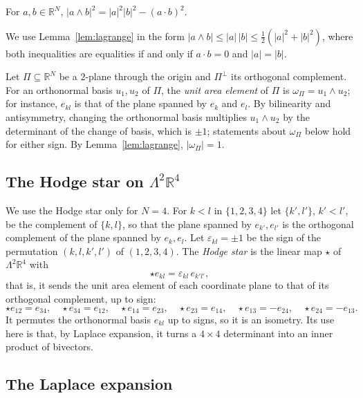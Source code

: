\begin{lemma}
  \label{lem:lagrange}
  For $a, b \in \mathbb{R}^{N}$,
  $|a \wedge b|^{2} = |a|^{2}|b|^{2} - (a \cdot b)^{2}$.
\end{lemma}

We use Lemma~\ref{lem:lagrange} in the form $|a \wedge b| \leq |a|\,|b| \leq
\frac12(|a|^{2} + |b|^{2})$, where both inequalities are equalities if and only
if $a \cdot b = 0$ and $|a| = |b|$.

Let $\Pi \subseteq \mathbb{R}^{N}$ be a $2$-plane through the origin and
$\Pi^{\perp}$ its orthogonal complement. For an orthonormal basis $u_{1},
u_{2}$ of $\Pi$, the \emph{unit area element} of $\Pi$ is
$\omega_{\Pi} = u_{1} \wedge u_{2}$; for instance, $e_{kl}$ is that of the
plane spanned by $e_{k}$ and $e_{l}$. By bilinearity and antisymmetry,
changing the orthonormal basis multiplies $u_{1} \wedge u_{2}$ by the
determinant of the change of basis, which is $\pm 1$; statements about
$\omega_{\Pi}$ below hold for either sign. By Lemma~\ref{lem:lagrange}, $|\omega_{\Pi}| = 1$.

\subsection{The Hodge star on \texorpdfstring{$\Lambda^{2}\mathbb{R}^{4}$}{Lambda2R4}}

We use the Hodge star only for $N = 4$. For $k < l$ in $\{1, 2, 3, 4\}$ let
$\{k', l'\}$, $k' < l'$, be the complement of $\{k, l\}$, so that the plane
spanned by $e_{k'}, e_{l'}$ is the orthogonal complement of the plane spanned
by $e_{k}, e_{l}$. Let $\varepsilon_{kl} = \pm 1$ be the sign of the
permutation $(k, l, k', l')$ of $(1, 2, 3, 4)$. The \emph{Hodge star} is the
linear map $\star$ of $\Lambda^{2}\mathbb{R}^{4}$ with
\[
  \star e_{kl} = \varepsilon_{kl}\, e_{k'l'},
\]
that is, it sends the unit area element of each coordinate plane to that of its
orthogonal complement, up to sign:
\[
  \star e_{12} = e_{34}, \quad \star e_{34} = e_{12}, \quad
  \star e_{14} = e_{23}, \quad \star e_{23} = e_{14}, \quad
  \star e_{13} = -e_{24}, \quad \star e_{24} = -e_{13}.
\]
It permutes the orthonormal basis $e_{kl}$ up to signs, so it is an isometry.
Its use here is that, by Laplace expansion, it turns a $4 \times 4$
determinant into an inner product of bivectors.

\subsection{The Laplace expansion}

